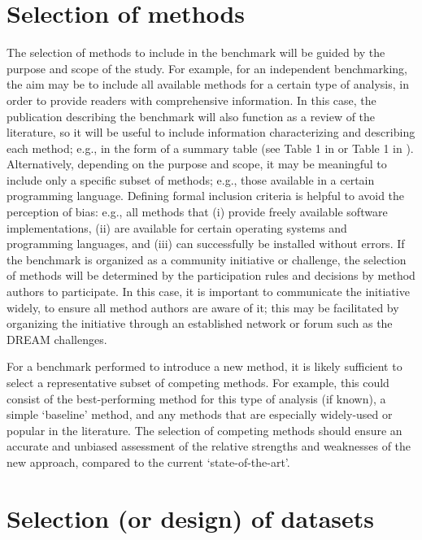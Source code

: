 \documentclass[12pt, a4paper]{article}
\begin{document}
\section*{Selection of methods}

The selection of methods to include in the benchmark will be guided by the purpose and scope of the study. For example, for an independent benchmarking, the aim may be to include all available methods for a certain type of analysis, in order to provide readers with comprehensive information. In this case, the publication describing the benchmark will also function as a review of the literature, so it will be useful to include information characterizing and describing each method; e.g., in the form of a summary table (see Table 1 in \citep{Weber2016} or Table 1 in \citep{Saelens2018b}). Alternatively, depending on the purpose and scope, it may be meaningful to include only a specific subset of methods; e.g., those available in a certain programming language. Defining formal inclusion criteria is helpful to avoid the perception of bias: e.g., all methods that (i) provide freely available software implementations, (ii) are available for certain operating systems and programming languages, and (iii) can successfully be installed without errors. If the benchmark is organized as a community initiative or challenge, the selection of methods will be determined by the participation rules and decisions by method authors to participate. In this case, it is important to communicate the initiative widely, to ensure all method authors are aware of it; this may be facilitated by organizing the initiative through an established network or forum such as the DREAM challenges.

For a benchmark performed to introduce a new method, it is likely sufficient to select a representative subset of competing methods. For example, this could consist of the best-performing method for this type of analysis (if known), a simple `baseline' method, and any methods that are especially widely-used or popular in the literature. The selection of competing methods should ensure an accurate and unbiased assessment of the relative strengths and weaknesses of the new approach, compared to the current `state-of-the-art'.




\section*{Selection (or design) of datasets}
\end{document}
